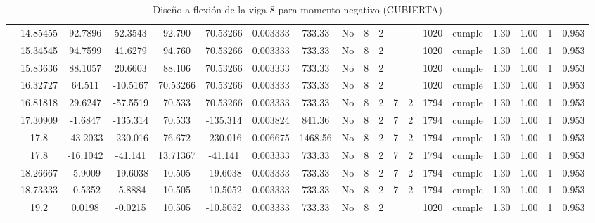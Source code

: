\begin{table}[H]
{\begin{tabular}{|c|c|c|c|c|c|r|c|c|c|c|c|c|c|c|c|c|c|c|}
\cline{2-19}    & 14.85455 & 92.7896 & 52.3543 & 92.790 & 70.53266 & 0.003333 & 733.33 & No  & 8   & 2   &     &     & 1020 & \cellcolor[rgb]{ .776,  .937,  .808}cumple & 1.30 & 1.00 & 1   & 0.953 \bigstrut\\
\cline{2-19}    & 15.34545 & 94.7599 & 41.6279 & 94.760 & 70.53266 & 0.003333 & 733.33 & No  & 8   & 2   &     &     & 1020 & \cellcolor[rgb]{ .776,  .937,  .808}cumple & 1.30 & 1.00 & 1   & 0.953 \bigstrut\\
\cline{2-19}    & 15.83636 & 88.1057 & 20.6603 & 88.106 & 70.53266 & 0.003333 & 733.33 & No  & 8   & 2   &     &     & 1020 & \cellcolor[rgb]{ .776,  .937,  .808}cumple & 1.30 & 1.00 & 1   & 0.953 \bigstrut\\
\cline{2-19}    & 16.32727 & 64.511 & -10.5167 & 70.53266 & 70.53266 & 0.003333 & 733.33 & No  & 8   & 2   &     &     & 1020 & \cellcolor[rgb]{ .776,  .937,  .808}cumple & 1.30 & 1.00 & 1   & 0.953 \bigstrut\\
\cline{2-19}    & 16.81818 & 29.6247 & -57.5519 & 70.533 & 70.53266 & 0.003333 & 733.33 & No  & 8   & 2   & 7   & 2   & 1794 & \cellcolor[rgb]{ .776,  .937,  .808}cumple & 1.30 & 1.00 & 1   & 0.953 \bigstrut\\
\cline{2-19}    & 17.30909 & -1.6847 & -135.314 & 70.533 & -135.314 & 0.003824 & 841.36 & No  & 8   & 2   & 7   & 2   & 1794 & \cellcolor[rgb]{ .776,  .937,  .808}cumple & 1.30 & 1.00 & 1   & 0.953 \bigstrut\\
\cline{2-19}    & \cellcolor[rgb]{ .851,  .882,  .949}17.8 & -43.2033 & -230.016 & 76.672 & -230.016 & 0.006675 & 1468.56 & No  & 8   & 2   & 7   & 2   & 1794 & \cellcolor[rgb]{ .776,  .937,  .808}cumple & 1.30 & 1.00 & 1   & 0.953 \bigstrut\\
\cline{2-19}    & \cellcolor[rgb]{ .851,  .882,  .949}17.8 & -16.1042 & -41.141 & 13.71367 & -41.141 & 0.003333 & 733.33 & No  & 8   & 2   & 7   & 2   & 1794 & \cellcolor[rgb]{ .776,  .937,  .808}cumple & 1.30 & 1.00 & 1   & 0.953 \bigstrut\\
\cline{2-19}    & 18.26667 & -5.9009 & -19.6038 & 10.505 & -19.6038 & 0.003333 & 733.33 & No  & 8   & 2   & 7   & 2   & 1794 & \cellcolor[rgb]{ .776,  .937,  .808}cumple & 1.30 & 1.00 & 1   & 0.953 \bigstrut\\
\cline{2-19}    & 18.73333 & -0.5352 & -5.8884 & 10.505 & -10.5052 & 0.003333 & 733.33 & No  & 8   & 2   & 7   & 2   & 1794 & \cellcolor[rgb]{ .776,  .937,  .808}cumple & 1.30 & 1.00 & 1   & 0.953 \bigstrut\\
\cline{2-19}    & 19.2 & 0.0198 & -0.0215 & 10.505 & -10.5052 & 0.003333 & 733.33 & No  & 8   & 2   &     &     & 1020 & \cellcolor[rgb]{ .776,  .937,  .808}cumple & 1.30 & 1.00 & 1   & 0.953 \bigstrut\\
\hline
\end{tabular}%

 
  }
      \caption{Diseño a flexión de la viga 8 para momento negativo (CUBIERTA) }
  \label{tab:F VG8 CUB M-}%
\end{table}%

